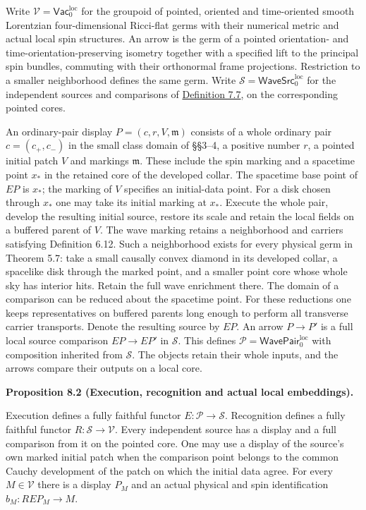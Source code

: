 \documentclass[
  english,
  11pt,
  reqno]{amsart}
\makeatletter
\newcommand{\pandocstatementheading}[1]{%
  \par\if@nobreak\else
    \addpenalty{\@beginparpenalty}%
    \addvspace{.5\baselineskip plus .2\baselineskip minus .2\baselineskip}%
  \fi
  {\normalfont\bfseries #1\par}%
  \nobreak\@afterindenttrue\@afterheading
}
\makeatother
\begin{document}
Write \(\mathcal V=\mathsf{Vac}^{\mathrm{loc}}_0\) for the groupoid of
pointed, oriented and time-oriented smooth Lorentzian four-dimensional
Ricci-flat germs with their numerical metric and actual local spin
structures. An arrow is the germ of a pointed orientation- and
time-orientation-preserving isometry together with a specified lift to
the principal spin bundles, commuting with their orthonormal frame
projections. Restriction to a smaller neighborhood defines the same
germ. Write \(\mathcal S=\mathsf{WaveSrc}^{\mathrm{loc}}_0\) for the
independent sources and comparisons of
\hyperref[def:online-complete-independent-wave-source]{Definition 7.7},
on the corresponding pointed cores.

An ordinary-pair display \(P=(c,r,V,\mathfrak m)\) consists of a whole
ordinary pair \(c=(c_+,c_-)\) in the small class domain of §§3--4, a
positive number \(r\), a pointed initial patch \(V\) and markings
\(\mathfrak m\). These include the spin marking and a spacetime point
\(x_*\) in the retained core of the developed collar. The spacetime base
point of \(EP\) is \(x_*\); the marking of \(V\) specifies an
initial-data point. For a disk chosen through \(x_*\) one may take its
initial marking at \(x_*\). Execute the whole pair, develop the
resulting initial source, restore its scale and retain the local fields
on a buffered parent of \(V\). The wave marking retains a neighborhood
and carriers satisfying Definition 6.12. Such a neighborhood exists for
every physical germ in Theorem 5.7: take a small causally convex diamond
in its developed collar, a spacelike disk through the marked point, and
a smaller point core whose whole sky has interior hits. Retain the full
wave enrichment there. The domain of a comparison can be reduced about
the spacetime point. For these reductions one keeps representatives on
buffered parents long enough to perform all transverse carrier
transports. Denote the resulting source by \(E P\). An arrow \(P\to P'\)
is a full local source comparison \(E P\to E P'\) in \(\mathcal S\).
This defines \(\mathcal P=\mathsf{WavePair}^{\mathrm{loc}}_0\) with
composition inherited from \(\mathcal S\). The objects retain their
whole inputs, and the arrows compare their outputs on a local core.

\pandocstatementheading{\leavevmode{}\label{prop:local-display-execution-recognition}Proposition 8.2 (Execution, recognition and actual local embeddings).}

Execution defines a fully faithful functor
\(E:\mathcal P\to\mathcal S\). Recognition defines a fully faithful
functor \(R:\mathcal S\to\mathcal V\). Every independent source has a
display and a full comparison from it on the pointed core. One may use a
display of the source's own marked initial patch when the comparison
point belongs to the common Cauchy development of the patch on which the
initial data agree. For every \(M\in\mathcal V\) there is a display
\(P_M\) and an actual physical and spin identification
\(b_M:R E P_M\to M\).
\end{document}
